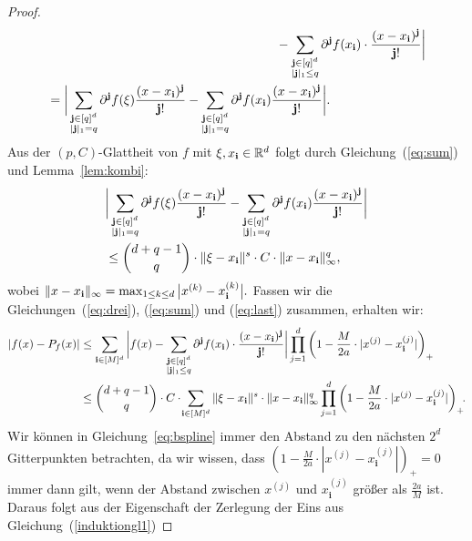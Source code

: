 \begin{proof}
\begin{equation}
\begin{split}
& \qquad \qquad \qquad \qquad \qquad \qquad \qquad \qquad \qquad - \sum_{\substack{\mathbf{j} \in [q]^d \\|\mathbf{j}|_1 \leq q}} \partial^{\mathbf{j}}f(x_{\mathbf{i}}) \cdot \frac{(x - x_{\mathbf{i}})^{\mathbf{j}}}{\mathbf{j}!}\bigg| \\
& = \bigg| \sum_{\substack{ \mathbf{j} \in [q]^d \\|\mathbf{j}|_1 = q}} \partial^{\mathbf{j}}f(\xi) \frac{ (x - x_{\mathbf{i}})^{\mathbf{j}} }{\mathbf{j}!} - \sum_{\substack{ \mathbf{j} \in [q]^d \\|\mathbf{j}|_1 = q}} \partial^{\mathbf{j}}f(x_{\mathbf{i}}) \frac{ (x - x_{\mathbf{i}})^{\mathbf{j}} }{\mathbf{j}!}\bigg|.
\end{split}
\end{equation}
Aus der $(p,C)$-Glattheit von $f$ mit $\xi, x_{\mathbf{i}} \in \mathbb{R}^d$ folgt durch Gleichung~(\ref{eq:sum}) und Lemma~\ref{lem:kombi}:
\begin{equation}
\label{eq:last}
\begin{split}
& \bigg| \sum_{\substack{ \mathbf{j} \in [q]^d \\|\mathbf{j}|_1 = q}} \partial^{\mathbf{j}}f(\xi) \frac{ (x - x_{\mathbf{i}})^{\mathbf{j}} }{\mathbf{j}!} - \sum_{\substack{ \mathbf{j} \in [q]^d \\|\mathbf{j}|_1 = q}} \partial^{\mathbf{j}}f(x_{\mathbf{i}}) \frac{ (x - x_{\mathbf{i}})^{\mathbf{j}} }{\mathbf{j}!}\bigg| \\
& \leq \binom{d + q - 1}{q} \cdot \|\xi - x_{\mathbf{i}} \|^s \cdot C \cdot \|x - x_{\mathbf{i}}\|_{\infty}^q,
\end{split}
\end{equation}
wobei $\|x - x_{\mathbf{i}}\|_{\infty} = \max_{1 \leq k \leq d}\big|x^{(k)} - x_{\mathbf{i}}^{(k)}\big|.$
Fassen wir die Gleichungen~(\ref{eq:drei}), (\ref{eq:sum}) und (\ref{eq:last}) zusammen, erhalten wir:
\begin{equation}
\label{last}
\begin{split}
|f(x) - P_f(x)| & \leq \sum_{\mathbf{i} \in [M]^d} \bigg|f(x) - \sum_{\substack{\mathbf{j} \in [q]^d \\|\mathbf{j}|_1 \leq q}} \partial^{\mathbf{j}}f(x_{\mathbf{i}}) \cdot \frac{(x - x_{\mathbf{i}})^{\mathbf{j}}}{\mathbf{j}!}\bigg| \prod_{j = 1}^d \bigg(1 - \frac{M}{2a} \cdot |x^{(j)} - x_{\mathbf{i}}^{(j)}|\bigg)_+ \\
& \leq \binom{d + q - 1}{q} \cdot C \cdot \!\sum_{\mathbf{i} \in [M]^d} \|\xi - x_{\mathbf{i}} \|^s \cdot \|x - x_{\mathbf{i}}\|_{\infty}^q \prod_{j = 1}^d \bigg(1 - \frac{M}{2a} \cdot |x^{(j)} - x_{\mathbf{i}}^{(j)}|\bigg)_+\!.
\end{split}
\end{equation}
Wir können in Gleichung~\eqref{eq:bspline} immer den Abstand zu den nächsten $2^d$ Gitterpunkten betrachten, da wir wissen, dass $(1 - \frac{M}{2a} \cdot |x^{(j)} - x_{\mathbf{i}}^{(j)}|)_+ = 0$ immer dann gilt, wenn der Abstand zwischen $x^{(j)}$ und $x_{\mathbf{i}}^{(j)}$ größer als $\frac{2a}{M}$ ist. Daraus folgt aus der Eigenschaft der Zerlegung der Eins aus Gleichung~(\ref{induktiongl1})

\end{proof}
